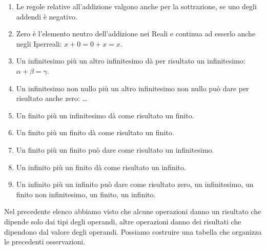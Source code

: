 \begin{enumerate}
 \item Le regole relative all'addizione valgono anche per la sottrazione, se 
uno degli addendi è negativo. 
 \item Zero è l'elemento neutro dell'addizione nei Reali e continua ad esserlo 
anche negli Iperreali: $x+0=0+x=x$.
 \item Un infinitesimo più un altro infinitesimo dà per risultato un 
infinitesimo: $\alpha+\beta=\gamma$.
 \item Un infinitesimo non nullo più un altro infinitesimo non nullo può dare 
per risultato anche zero: \dots
 \item Un finito più un infinitesimo dà come risultato un finito.
 \item Un finito più un finito dà come risultato un finito.
 \item Un finito più un finito può dare come risultato un infinitesimo.
 \item Un infinito più un finito dà come risultato un infinito.
 \item Un infinito più un infinito può dare come risultato zero, un 
infinitesimo, un finito non infinitesimo, un finito, un infinito.
\end{enumerate}

Nel precedente elenco abbiamo visto che alcune operazioni danno un risultato 
che dipende solo dai tipi degli operandi, altre operazioni danno dei risultati 
che dipendono dal valore degli operandi. Possiamo costruire una tabella che 
organizza le precedenti osservazioni.
% 

